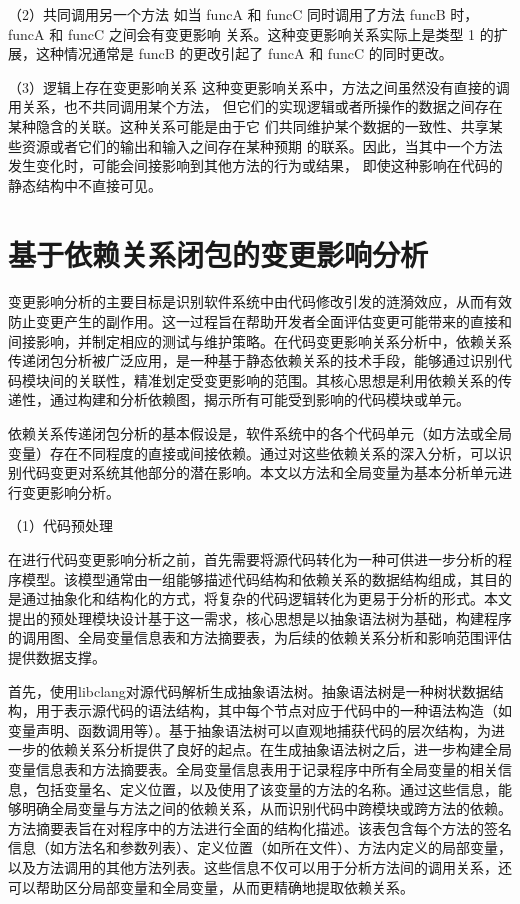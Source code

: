 （2）共同调用另一个方法
如当 funcA 和 funcC 同时调用了方法 funcB 时，funcA 和 funcC 之间会有变更影响
关系。这种变更影响关系实际上是类型 1 的扩展，这种情况通常是 funcB 的更改引起了
funcA 和 funcC 的同时更改。

（3）逻辑上存在变更影响关系
这种变更影响关系中，方法之间虽然没有直接的调用关系，也不共同调用某个方法，
但它们的实现逻辑或者所操作的数据之间存在某种隐含的关联。这种关系可能是由于它
们共同维护某个数据的一致性、共享某些资源或者它们的输出和输入之间存在某种预期
的联系。因此，当其中一个方法发生变化时，可能会间接影响到其他方法的行为或结果，
即使这种影响在代码的静态结构中不直接可见。

\section{基于依赖关系闭包的变更影响分析}

变更影响分析的主要目标是识别软件系统中由代码修改引发的涟漪效应，从而有效防止变更产生的副作用。这一过程旨在帮助开发者全面评估变更可能带来的直接和间接影响，并制定相应的测试与维护策略。在代码变更影响关系分析中，依赖关系传递闭包分析被广泛应用，是一种基于静态依赖关系的技术手段，能够通过识别代码模块间的关联性，精准划定受变更影响的范围\cite{2021Improving}。其核心思想是利用依赖关系的传递性，通过构建和分析依赖图，揭示所有可能受到影响的代码模块或单元。

依赖关系传递闭包分析的基本假设是，软件系统中的各个代码单元（如方法或全局变量）存在不同程度的直接或间接依赖。通过对这些依赖关系的深入分析，可以识别代码变更对系统其他部分的潜在影响。本文以方法和全局变量为基本分析单元进行变更影响分析。

（1）代码预处理

在进行代码变更影响分析之前，首先需要将源代码转化为一种可供进一步分析的程序模型。该模型通常由一组能够描述代码结构和依赖关系的数据结构组成，其目的是通过抽象化和结构化的方式，将复杂的代码逻辑转化为更易于分析的形式。本文提出的预处理模块设计基于这一需求，核心思想是以抽象语法树为基础，构建程序的调用图、全局变量信息表和方法摘要表，为后续的依赖关系分析和影响范围评估提供数据支撑。

首先，使用libclang对源代码解析生成抽象语法树。抽象语法树是一种树状数据结构，用于表示源代码的语法结构，其中每个节点对应于代码中的一种语法构造（如变量声明、函数调用等）。基于抽象语法树可以直观地捕获代码的层次结构，为进一步的依赖关系分析提供了良好的起点。在生成抽象语法树之后，进一步构建全局变量信息表和方法摘要表。全局变量信息表用于记录程序中所有全局变量的相关信息，包括变量名、定义位置，以及使用了该变量的方法的名称。通过这些信息，能够明确全局变量与方法之间的依赖关系，从而识别代码中跨模块或跨方法的依赖。方法摘要表旨在对程序中的方法进行全面的结构化描述。该表包含每个方法的签名信息（如方法名和参数列表）、定义位置（如所在文件）、方法内定义的局部变量，以及方法调用的其他方法列表。这些信息不仅可以用于分析方法间的调用关系，还可以帮助区分局部变量和全局变量，从而更精确地提取依赖关系。

